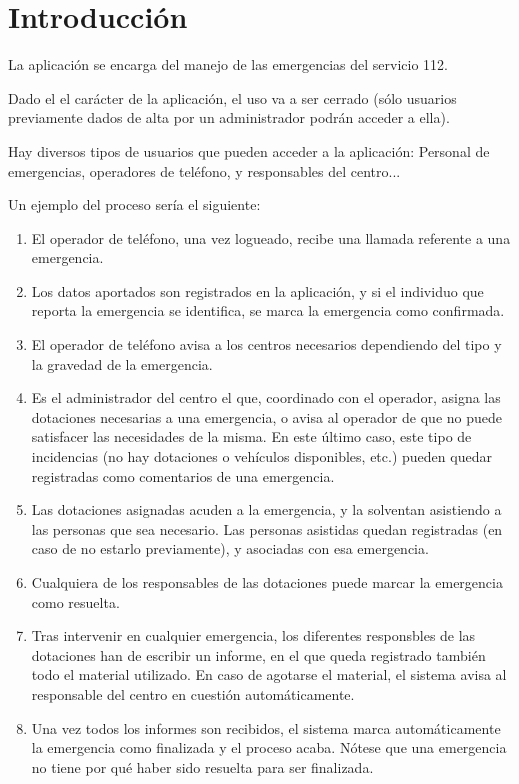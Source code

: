 \section{Introducción}

La aplicación se encarga del manejo de las emergencias del servicio 112.

Dado el el carácter de la aplicación, el uso va a ser cerrado (sólo usuarios previamente dados de alta por un administrador podrán acceder a ella).

Hay diversos tipos de usuarios que pueden acceder a la aplicación: Personal de emergencias, operadores de teléfono, y responsables del centro...

Un ejemplo del proceso sería el siguiente:

\begin{enumerate}
\item{El operador de teléfono, una vez logueado, recibe una llamada referente a una emergencia.}
\item{Los datos aportados son registrados en la aplicación, y si el individuo que reporta la emergencia se identifica, se marca la emergencia como confirmada.}
\item{El operador de teléfono avisa a los centros necesarios dependiendo del tipo y la gravedad de la emergencia.}
\item{Es el administrador del centro el que, coordinado con el operador, asigna las dotaciones necesarias a una emergencia, o avisa al operador de que no puede satisfacer las necesidades de la misma. En este último caso, este tipo de incidencias (no hay dotaciones o vehículos disponibles, etc.) pueden quedar registradas como comentarios de una emergencia.}
\item{Las dotaciones asignadas acuden a la emergencia, y la solventan asistiendo a las personas que sea necesario. Las personas asistidas quedan registradas (en caso de no estarlo previamente), y asociadas con esa emergencia.}
\item{Cualquiera de los responsables de las dotaciones puede marcar la emergencia como resuelta.}
\item{Tras intervenir en cualquier emergencia, los diferentes responsbles de las dotaciones han de escribir un informe, en el que queda registrado también todo el material utilizado. En caso de agotarse el material, el sistema avisa al responsable del centro en cuestión automáticamente.}
\item{Una vez todos los informes son recibidos, el sistema marca automáticamente la emergencia como finalizada y el proceso acaba. Nótese que una emergencia no tiene por qué haber sido resuelta para ser finalizada.}
\end{enumerate}

